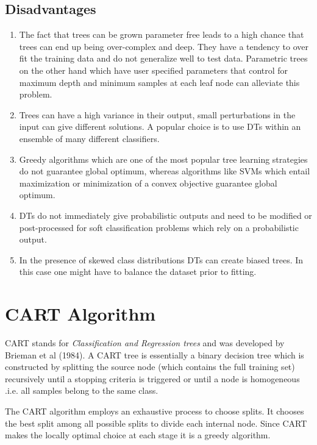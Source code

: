 \documentclass[final,3p,times,twocolumn]{elsarticle}
\begin{document}
\subsection{Disadvantages}

\begin{enumerate}
\item{The fact that trees can be grown parameter free leads to a high chance that trees can end up being over-complex and deep. They have a tendency to over fit the training data and do not generalize well to test data. Parametric trees on the other hand which have user specified parameters that control for maximum depth and minimum samples at each leaf node can alleviate this problem.}
\item{Trees can have a high variance in their output, small perturbations in the input can give different solutions. A popular choice is to use DTs within an ensemble of many different classifiers.} 
\item{Greedy algorithms which are one of the most popular tree learning strategies do not guarantee global optimum, whereas algorithms like SVMs which entail maximization or minimization of a convex objective guarantee global optimum.}
\item{DTs do not immediately give probabilistic outputs and need to be modified or post-processed for soft classification problems which rely on a probabilistic output.}
\item{In the presence of skewed class distributions DTs can create biased trees. In this case one might have to balance the dataset prior to fitting.}
\end{enumerate}

\section{CART Algorithm}
\label{CART}
CART stands for \textit{Classification and Regression trees} and was developed by Brieman et al (1984). A CART tree is essentially a binary decision tree which is constructed by splitting the source node (which contains the full training set) recursively until a stopping criteria is triggered or until a node is homogeneous .i.e. all samples belong to the same class.  

The CART algorithm employs an exhaustive process to choose splits. It chooses the best split among all possible splits to divide each internal node. Since CART makes the locally optimal choice at each stage it is a greedy algorithm.
\end{document}
